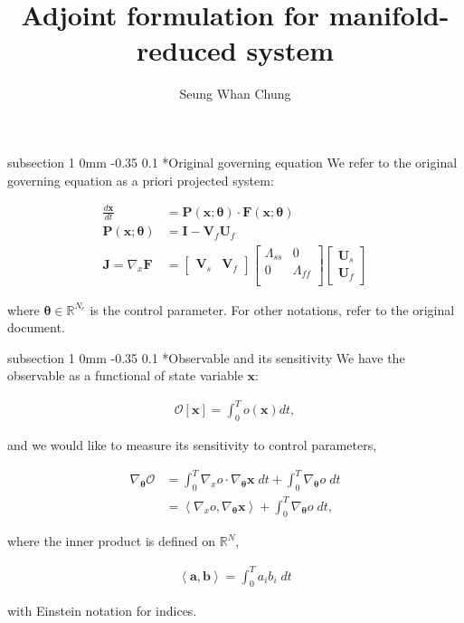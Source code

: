 \documentclass[11pt]{article}
\title{Adjoint formulation for manifold-reduced system}
\author{Seung Whan Chung}
\makeatletter
\renewcommand{\subsection}{\@startsection
{subsection}%
{1}%
{0mm}%
{-0.35\baselineskip}%
{0.1\baselineskip}%
{\normalfont\large\bfseries\color{brown}}}%
\def\Dnorm#1#2{ \frac{d #1 }{ d #2} }
\newcommand\eqsp[2]{
\begin{equation#1}
\begin{split}
#2
\end{split}
\end{equation#1}
}
\newcommand{\cO}{\mathcal{O}}
\newcommand{\bx}{\mathbf{x}}
\newcommand{\bt}{\mathbf{\theta}}
\newcommand{\bI}{\mathbf{I}}
\newcommand{\bP}{\mathbf{P}}
\newcommand{\bF}{\mathbf{F}}
\newcommand{\bV}{\mathbf{V}}
\newcommand{\bU}{\mathbf{U}}
\newcommand{\bJ}{\mathbf{J}}
\newcommand{\inprod}[2]{\left\langle #1,#2 \right\rangle}
\makeatother
\begin{document}
\maketitle

\subsection*{Original governing equation}
We refer to the original governing equation as a priori projected system:
\eqsp{}{
\Dnorm{\bx}{t} &= \bP(\bx;\bt)\cdot\bF(\bx;\bt)\\
\bP(\bx;\bt) &= \bI - \bV_f\bU_f\\
\bJ = \nabla_x\bF &= 
\begin{bmatrix}
\bV_s & \bV_f
\end{bmatrix}
\begin{bmatrix}
\Lambda_{ss} & 0 \\
0 & \Lambda_{ff} \\
\end{bmatrix}
\begin{bmatrix}
\bU_s \\
\bU_f
\end{bmatrix}
\label{e1}
}
where $\bt\in \mathbb{R}^{N_c}$ is the control parameter. For other notations, refer to the original document.

\subsection*{Observable and its sensitivity}
We have the observable as a functional of state variable $\bx$:
\eqsp{*}{
\cO[\bx] = \int_0^T o(\bx) dt,
}
and we would like to measure its sensitivity to control parameters,
\eqsp{}{
\nabla_{\bt}\cO &= \int_0^T \nabla_xo\cdot\nabla_{\bt}\bx\;dt + \int_0^T \nabla_{\bt}o\;dt\\
&= \inprod{\nabla_xo}{\nabla_{\bt}\bx} + \int_0^T \nabla_{\bt}o\;dt,
\label{e2}
}
where the inner product is defined on $\mathbb{R}^{N}$,
\eqsp{*}{
\inprod{\mathbf{a}}{\mathbf{b}} = \int_0^T a_ib_i\;dt
}
with Einstein notation for indices.
\end{document}
